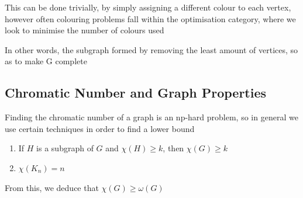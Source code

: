 \documentclass[english,course]{Notes}
\begin{document}
\par{This can be done trivially, by simply assigning a different colour to each vertex, however often colouring problems fall within the optimisation category, where we look to minimise the number of colours used}





\par{In other words, the subgraph formed by removing the least amount of vertices, so as to make G complete}


\subsection{Chromatic Number and Graph Properties}

\par{Finding the chromatic number of a graph is an np-hard problem, so in general we use certain techniques in order to find a lower bound}

\begin{enumerate}
\item If $H$ is a subgraph of $G$ and $\chi(H) \geq k$, then $\chi(G) \geq k$

\item $\chi(K_{n}) = n$
\end{enumerate}

\par{From this, we deduce that $\chi(G) \geq \omega(G)$} 




\end{document}
